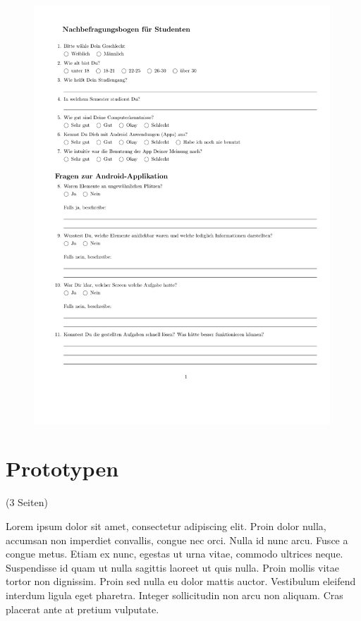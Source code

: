 \begin{figure}
  \vspace{-20pt}
  \begin{center}
    \includegraphics[page=3,width=0.99\textwidth]{./images/student}
  \end{center}
  \vspace{-40pt}
\end{figure}

\clearpage
\section{Prototypen}
\label{sec:prototypen}

(3 Seiten)

Lorem ipsum dolor sit amet, consectetur adipiscing elit. Proin dolor nulla, accumsan non imperdiet convallis, congue nec orci. Nulla id nunc arcu. Fusce a congue metus. Etiam ex nunc, egestas ut urna vitae, commodo ultrices neque. Suspendisse id quam ut nulla sagittis laoreet ut quis nulla. Proin mollis vitae tortor non dignissim. Proin sed nulla eu dolor mattis auctor. Vestibulum eleifend interdum ligula eget pharetra. Integer sollicitudin non arcu non aliquam. Cras placerat ante at pretium vulputate.

